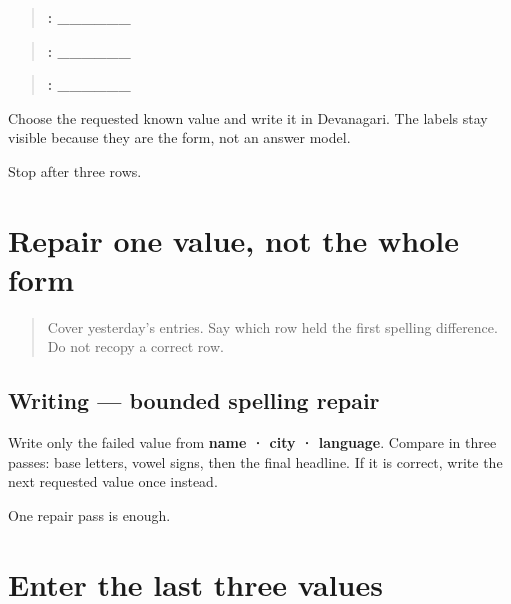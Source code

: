 \begin{quote}
\textbf{: \_\_\_\_\_\_}
\end{quote}

\begin{quote}
\textbf{: \_\_\_\_\_\_}
\end{quote}

\begin{quote}
\textbf{: \_\_\_\_\_\_}
\end{quote}

Choose the requested known value and write it in Devanagari. The labels stay visible because they are the form, not an answer model.

\begin{tcolorbox}[breakable,colback=teal!4,colframe=teal!35!black,title={Before you move on}]
Stop after three rows.
\end{tcolorbox}
\section[\texorpdfstring{\mr{अरुण} · \mr{पुणे} · \mr{मराठी} (Aruṇ · Puṇe · marāṭhī)}{अरुण · पुणे · मराठी (Aruṇ · Puṇe · marāṭhī)}]{Repair one value, not the whole form}

\label{lesson:MR-A1F07-first-three-spelling}



\begin{quote}
Cover yesterday's entries. Say which row held the first spelling difference. Do not recopy a correct row.
\end{quote}

\subsection*{Writing — bounded spelling repair}
Write only the failed value from \textbf{name · city · language}. Compare in three passes: base letters, vowel signs, then the final headline. If it is correct, write the next requested value once instead.

\begin{tcolorbox}[breakable,colback=teal!4,colframe=teal!35!black,title={Before you move on}]
One repair pass is enough.
\end{tcolorbox}
\section[\texorpdfstring{\mr{आवडते} \mr{पेय} … (āvaḍte pey …)}{आवडते पेय … (āvaḍte pey …)}]{Enter the last three values}


